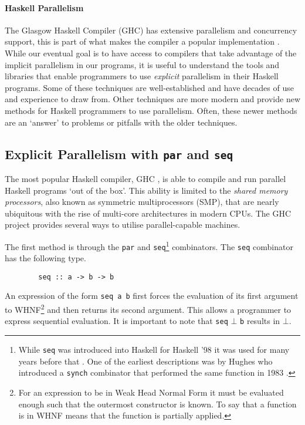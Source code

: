 \paragraph{Haskell Parallelism}

The Glasgow Haskell Compiler (GHC) has extensive parallelism and concurrency
support, this is part of what makes the compiler a popular implementation
\citep{HistoryOfHaskell}. While our eventual goal is to have access to
compilers that take advantage of the implicit parallelism in our programs, it
is useful to understand the tools and libraries that enable programmers to use
\emph{explicit} parallelism in their Haskell programs. Some of these techniques
are well-established and have decades of use and experience to draw from. Other
techniques are more modern and provide new methods for Haskell programmers to
use parallelism. Often, these newer methods are an `answer' to problems or
pitfalls with the older techniques.

\subsection{Explicit Parallelism with \texttt{par} and \texttt{seq}}

The most popular Haskell compiler, GHC \citep{HistoryOfHaskell}, is able to
compile and run parallel Haskell programs `out of the box'. This ability is
limited to the \emph{shared memory processors}, also known as symmetric
multiprocessors (SMP), that are nearly ubiquitous with the rise of multi-core
architectures in modern CPUs. The GHC project provides several ways to utilise
parallel-capable machines.

The first method is through the \verb=par= and \verb=seq=\footnote{While
\texttt{seq} was introduced into Haskell for Haskell '98 \citep{Haskell98Book}
it was used for many years before that \citep{HistoryOfHaskell}. One of the
earliest descriptions was by Hughes who introduced a \texttt{synch} combinator
that performed the same function in 1983 \citep{hughes:thesis}.} combinators.
The \verb=seq= combinator has the following type.

\begin{verbatim}
        seq :: a -> b -> b 
\end{verbatim}

An expression of the form \verb=seq a b= first forces the evaluation of its
first argument to WHNF\footnote{For an expression to be in Weak Head Normal
Form it must be evaluated enough such that the outermost constructor is known.
To say that a function is in WHNF means that the function is partially
applied.} and then returns its second argument. This allows a programmer to
express sequential evaluation. It is important to note that \verb=seq= $\bot$
\verb=b= results in $\bot$.

